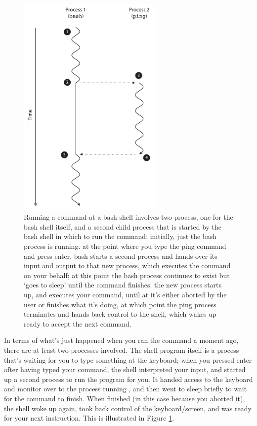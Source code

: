 \begin{figure}
\centerline{\includegraphics[width=7cm]{images/bashandping}}
\caption{Running a command at a bash shell involves two process, one for the bash shell itself, and a second child process that is started by the bash shell in which to run the command: \protect{} initially, just the bash process is running. \protect{} at the point where you type the ping command and press enter, bash starts a second process and hands over its input and output to that new process, which executes the command on your behalf; at this point the bash process continues to exist but `goes to sleep' until the command finishes. \protect{} the new process starts up, and executes your command, until at \protect{} it's either aborted by the user or finishes what it's doing, at which point \protect{} the ping process terminates and hands back control to the shell, which wakes up ready to accept the next command.}\label{figure:bashandping}
\label{fig:bashandping}
\end{figure}

In terms of what's just happened when you ran the  command a
moment ago, there are at least two processes involved. The shell
program itself is a process that's waiting for you to type something
at the keyboard; when you pressed enter after having typed your
command, the shell interpreted your input, and started up a second
process to run the  program for you. It handed
access to the keyboard and monitor over to the process running ,
and then  went to sleep briefly to wait for the  command to
finish. When  finished (in this case because you aborted it), the
shell woke up again, took back control of the keyboard/screen, and was
ready for your next instruction. This is illustrated in Figure
\ref{fig:bashandping}.

